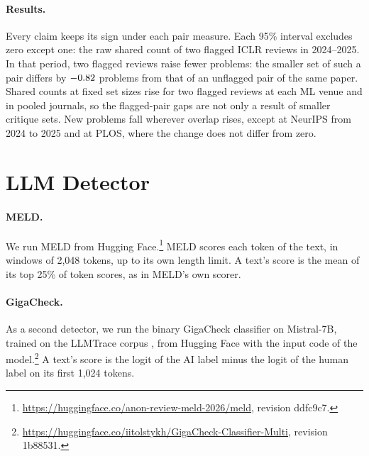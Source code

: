 \documentclass[11pt]{article}
\begin{document}
\begin{table}[H]
\centering\small
\setlength{\tabcolsep}{3pt}

\caption{Every main claim keeps its sign under each pair measure. The claims predict a positive sign for pair measures and a negative sign for new problems. $^\dagger$ marks an estimate that does not differ from zero in that direction at the 95\% level. A change over time is the last year minus the base year, or minus the 2019--2023 mean for journals. A within-paper gap compares two flagged with two unflagged reviews of one paper, in a regression with paper fixed effects.}
\label{tab:measures}
\end{table}


\paragraph{Results.} Every claim keeps its sign under each pair measure. Each 95\% interval excludes zero except one: the raw shared count of two flagged ICLR reviews in 2024--2025. In that period, two flagged reviews raise fewer problems: the smaller set of such a pair differs by $-0.82$ problems from that of an unflagged pair of the same paper. Shared counts at fixed set sizes rise for two flagged reviews at each ML venue and in pooled journals, so the flagged-pair gaps are not only a result of smaller critique sets. New problems fall wherever overlap rises, except at NeurIPS from 2024 to 2025 and at PLOS, where the change does not differ from zero.

\section{LLM Detector}
\label{app:ai}

\paragraph{MELD.}
We run MELD \citep{li2026meld} from Hugging Face.\footnote{\url{https://huggingface.co/anon-review-meld-2026/meld}, revision ddfc9c7.} MELD scores each token of the text, in windows of 2,048 tokens, up to its own length limit. A text's score is the mean of its top 25\% of token scores, as in MELD's own scorer.

\paragraph{GigaCheck.}
As a second detector, we run the binary GigaCheck classifier \citep{tolstykh2026gigacheck} on Mistral-7B, trained on the LLMTrace corpus \citep{tolstykh2026llmtrace}, from Hugging Face with the input code of the model.\footnote{\url{https://huggingface.co/iitolstykh/GigaCheck-Classifier-Multi}, revision 1b88531.} A text's score is the logit of the AI label minus the logit of the human label on its first 1,024 tokens.
\end{document}
